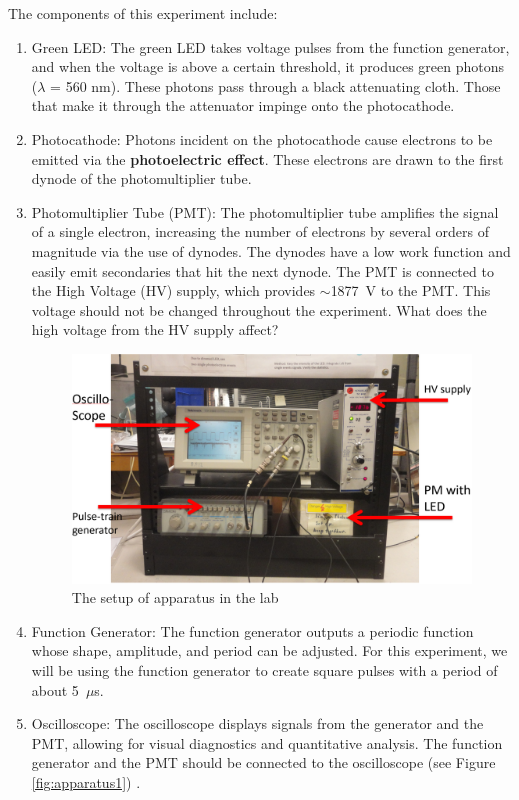 \documentclass[10pt,aps,twocolumn,secnumarabic,balancelastpage,amsmath,amssymb,nofootinbib,floatfix]{revtex4}
\begin{document}
The components of this experiment include:
\begin{enumerate}

\item Green LED: The green LED takes voltage pulses from the function generator, and when the voltage is above a certain threshold, it produces green photons ($\lambda$ = 560 nm). These photons pass through a black attenuating cloth. Those that make it through the attenuator impinge onto the photocathode. 

\item Photocathode: Photons incident on the photocathode cause electrons to be emitted via the \textbf{photoelectric effect}. These electrons are drawn to the first dynode of the photomultiplier tube. 

\item Photomultiplier Tube (PMT): The photomultiplier tube amplifies the signal of a single electron, increasing the number of electrons by several orders of magnitude via the use of dynodes. The dynodes have a low work function and easily emit secondaries that hit the next dynode. The PMT is connected to the High Voltage (HV) supply, which provides $\sim$1877~V to the PMT. This voltage should not be changed throughout the experiment. What does the high voltage from the HV supply affect?

\begin{figure}
  \centering
  \includegraphics[width=1.0\linewidth]{figs/apparatus2.png}
  \caption{The setup of apparatus in the lab}
  \label{fig:apparatus2}
\end{figure}

\item Function Generator: The function generator outputs a periodic function whose shape, amplitude, and period can be adjusted. For this experiment, we will be using the function generator to create square pulses with a period of about 5~$\mu$s.

\item Oscilloscope: The oscilloscope displays signals from the generator and the PMT, allowing for visual diagnostics and quantitative analysis. The function generator and the PMT should be connected to the oscilloscope (see Figure \ref{fig:apparatus1}) \cite{tds2000}. 

\end{enumerate}
\end{document}
